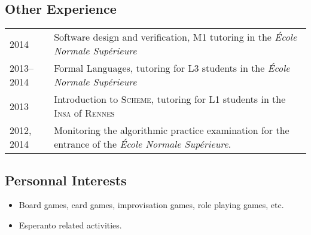 \documentclass[12pt,a4paper]{article}
\makeatletter
\newcommand{\fr}[1]{\foreignlanguage{francais}{\textit{#1}}}
\newenvironment{datecvsection}[1]%
               {\subsection*{#1}%
                 \noindent \begin{tabular}{@{}p{\annee}p{\texte}@{}}}
               {\end{tabular}}
\newenvironment{itemcvsection}[1]%
               {\subsection*{#1}\begin{itemize}}
               {\end{itemize}}
\makeatother
\begin{document}
\begin{datecvsection}{Other Experience}

    2014 & Software design and verification, M1 tutoring in the \fr{École Normale Supérieure} \\

    2013–2014 & Formal Languages, tutoring for L3 students in the \fr{École Normale Supérieure} \\

    2013 & Introduction to \textsc{Scheme}, tutoring for L1 students in the \textsc{Insa} of \textsc{Rennes} \\

	2012, 2014 & Monitoring the algorithmic practice examination for the entrance of the \fr{École Normale Supérieure}.

\end{datecvsection}

\begin{itemcvsection}{Personnal Interests}

	\item Board games, card games, improvisation games, role playing games, etc.
    \item Esperanto related activities.

\end{itemcvsection}
\end{document}
